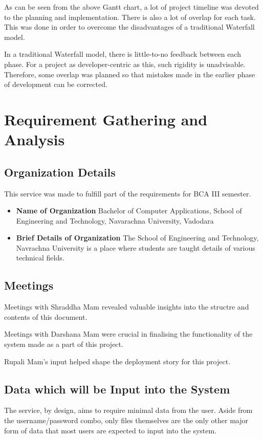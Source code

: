 \documentclass[12pt,a4paper]{report}
\begin{document}
As can be seen from the above Gantt chart, a lot of project timeline was devoted to the planning and implementation.
There is also a lot of overlap for each task.
This was done in order to overcome the disadvantages of a traditional Waterfall model.

In a traditional Waterfall model, there is little-to-no feedback between each phase.
For a project as developer-centric as this, such rigidity is unadvisable.
Therefore, some overlap was planned so that mistakes made in the earlier phase of development can be corrected.

\newpage
\chapter{Requirement Gathering and Analysis}\label{sec:requirement_gathering_and_analysis}
\section{Organization Details}\label{sec:organization_details}

This service was made to fulfill part of the requirements for BCA III semester.

\begin{itemize}
	\item \textbf{Name of Organization}
	      Bachelor of Computer Applications, School of Engineering and Technology, Navarachna University, Vadodara

	\item \textbf{Brief Details of Organization}
	      The School of Engineering and Technology, Navrachna University is a place where students are taught details of various technical fields.
\end{itemize}

\section{Meetings}\label{sec:meetings}
Meetings with Shraddha Mam revealed valuable insights into the structre and contents of this document.

Meetings with Darshana Mam were crucial in finalising the functionality of the system made as a part of this project.

Rupali Mam's input helped shape the deployment story for this project.
\section{Data which will be Input into the System}\label{sec:data_which_will_be_input_into_system}
The service, by design, aims to require minimal data from the user. Aside from the username/password combo, only files themselves are the only other major form of data that most users are expected to input into the system.
\end{document}
